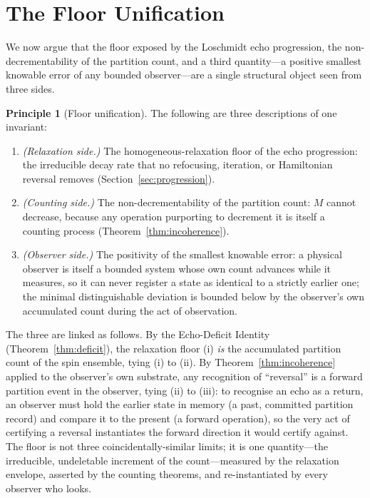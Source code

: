 \documentclass[11pt,a4paper]{article}
\theoremstyle{thmstyle}
\theoremstyle{definition}
\newtheorem{principle}[theorem]{Principle}
\theoremstyle{remark}
\newcommand{\Count}{M}
\begin{document}
\section{The Floor Unification}
\label{sec:floor-unification}

We now argue that the floor exposed by the Loschmidt echo progression,
the non-decrementability of the partition count, and a third quantity---a
positive smallest knowable error of any bounded observer---are a single
structural object seen from three sides.

\begin{principle}[Floor unification]
\label{prin:floor}
The following are three descriptions of one invariant:
\begin{enumerate}[leftmargin=1.6em,label=(\roman*),itemsep=0.2em]
\item \emph{(Relaxation side.)} The homogeneous-relaxation floor of the
echo progression: the irreducible decay rate that no refocusing,
iteration, or Hamiltonian reversal removes
(Section~\ref{sec:progression}).
\item \emph{(Counting side.)} The non-decrementability of the partition
count: $\Count$ cannot decrease, because any operation purporting to
decrement it is itself a counting process
(Theorem~\ref{thm:incoherence}).
\item \emph{(Observer side.)} The positivity of the smallest knowable
error: a physical observer is itself a bounded system whose own count
advances while it measures, so it can never register a state as
identical to a strictly earlier one; the minimal distinguishable
deviation is bounded below by the observer's own accumulated count during
the act of observation.
\end{enumerate}
\end{principle}

The three are linked as follows. By the Echo-Deficit Identity
(Theorem~\ref{thm:deficit}), the relaxation floor (i) \emph{is} the
accumulated partition count of the spin ensemble, tying (i) to (ii). By
Theorem~\ref{thm:incoherence} applied to the observer's own substrate, any
recognition of ``reversal'' is a forward partition event in the observer,
tying (ii) to (iii): to recognise an echo as a return, an observer must
hold the earlier state in memory (a past, committed partition record) and
compare it to the present (a forward operation), so the very act of
certifying a reversal instantiates the forward direction it would
certify against. The floor is not three coincidentally-similar limits; it
is one quantity---the irreducible, undeletable increment of the
count---measured by the relaxation envelope, asserted by the counting
theorems, and re-instantiated by every observer who looks.
\end{document}
